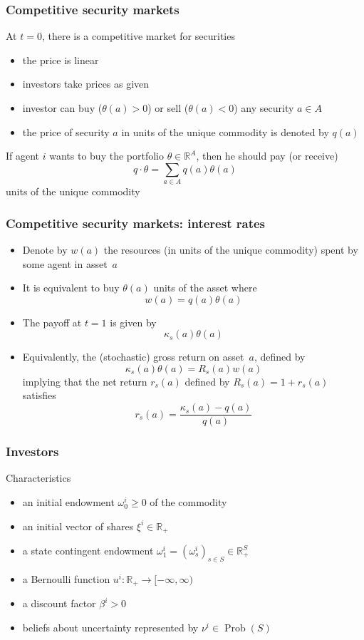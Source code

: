 \documentclass[blue]{beamer}
\def\R{\mathbb{R}}
\def\geq{\geqslant}
\DeclareMathOperator\Prob{Prob}
\theoremstyle{definition}
\theoremstyle{example}
\begin{document}
\begin{frame}\frametitle{Competitive security markets}

At $t=0$, there is a competitive market for securities
    \begin{itemize}
    \item the price is linear
    \item investors take prices as given
    \item investor can buy ($\theta(a)>0$) or sell ($\theta(a)<0$) any security $a\in A$
    \item the price of security $a$ in units of the unique commodity is denoted by $q(a)$
    \end{itemize}
If agent $i$ wants to buy the portfolio $\theta \in \R^A$, then he should pay (or receive)
\[
q \cdot \theta = \sum_{a \in A} q(a) \theta(a)
\]
 units of the unique commodity

\end{frame}


\begin{frame}\frametitle{Competitive security markets: interest rates}

\begin{itemize}
\item Denote by $w(a)$ the resources (in units of the unique commodity) spent by some agent in asset~$a$
\item It is equivalent to buy $\theta(a)$ units of the asset where
\[
w(a) = q(a) \theta(a)
\]
\item The payoff at $t=1$ is given by
\[
\kappa_s(a) \theta(a)
\]
\item Equivalently, the (stochastic) gross return on asset~$a$, defined by
\[
\kappa_s(a) \theta(a) = R_s(a) w(a)
\]
implying that the net return $r_s(a)$ defined by $R_s(a) = 1 + r_s(a)$ satisfies
\[
r_s(a) = \frac{\kappa_s(a) - q(a)}{q(a)}
\]
\end{itemize}
\end{frame}



\begin{frame}\frametitle{Investors}

\begin{block}{Characteristics}
\begin{itemize}
\item an initial endowment $\omega^i_0 \geq 0$ of the commodity
\item an initial vector of shares $\xi^i \in \R_+$
\item a state contingent endowment $\omega^i_1=(\omega^i_s)_{s\in S} \in \R^S_+$
\item a Bernoulli function $u^i : \R_+ \to [-\infty,\infty)$
\item a discount factor $\beta^i >0$
\item beliefs about uncertainty represented by $\nu^i \in \Prob(S)$
\end{itemize}
\end{block}

\end{frame}
\end{document}

